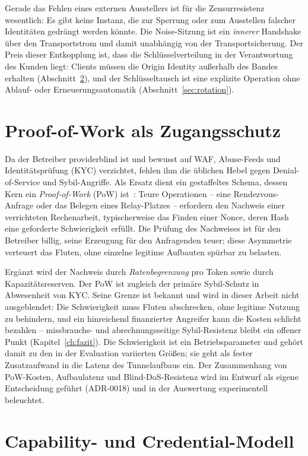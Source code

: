 Gerade das Fehlen eines externen Ausstellers ist für die Zensurresistenz
wesentlich: Es gibt keine Instanz, die zur Sperrung oder zum Ausstellen falscher
Identitäten gedrängt werden könnte. Die Noise-Sitzung ist ein \emph{innerer}
Handshake über den Transportstrom und damit unabhängig von der Transportsicherung.
Der Preis dieser Entkopplung ist, dass die Schlüsselverteilung in der
Verantwortung des Kunden liegt: Clients müssen die Origin Identity außerhalb des
Bandes erhalten (Abschnitt~\ref{sec:capabilities}), und der Schlüsseltausch ist
eine explizite Operation ohne Ablauf- oder Erneuerungsautomatik
(Abschnitt~\ref{sec:rotation}).

\section{Proof-of-Work als Zugangsschutz}
\label{sec:pow}

Da der Betreiber providerblind ist und bewusst auf WAF, Abuse-Feeds und
Identitätsprüfung (KYC) verzichtet, fehlen ihm die üblichen Hebel gegen
Denial-of-Service und Sybil-Angriffe. Als Ersatz dient ein gestaffeltes Schema,
dessen Kern ein \emph{Proof-of-Work} (PoW) ist~\cite{back2002hashcash}: Teure
Operationen -- eine Rendezvous-Anfrage oder das Belegen eines Relay-Platzes --
erfordern den Nachweis einer verrichteten Rechenarbeit, typischerweise das Finden
einer Nonce, deren Hash eine geforderte Schwierigkeit erfüllt. Die Prüfung des
Nachweises ist für den Betreiber billig, seine Erzeugung für den Anfragenden
teuer; diese Asymmetrie verteuert das Fluten, ohne einzelne legitime Aufbauten
spürbar zu belasten.

Ergänzt wird der Nachweis durch \emph{Ratenbegrenzung} pro Token sowie durch
Kapazitätsreserven. Der PoW ist zugleich der primäre Sybil-Schutz in Abwesenheit
von KYC. Seine Grenze ist bekannt und wird in dieser Arbeit nicht ausgeblendet:
Die Schwierigkeit muss Fluten abschrecken, ohne legitime Nutzung zu behindern,
und ein hinreichend finanzierter Angreifer kann die Kosten schlicht bezahlen --
missbrauchs- und abrechnungsseitige Sybil-Resistenz bleibt ein offener Punkt
(Kapitel~\ref{ch:fazit}). Die Schwierigkeit ist ein Betriebsparameter und
gehört damit zu den in der Evaluation variierten Größen; sie geht als fester
Zusatzaufwand in die Latenz des Tunnelaufbaus ein. Der Zusammenhang von
PoW-Kosten, Aufbaulatenz und Blind-DoS-Resistenz wird im Entwurf als eigene
Entscheidung geführt (ADR-0018) und in der Auswertung experimentell beleuchtet.

\section{Capability- und Credential-Modell}
\label{sec:capabilities}

